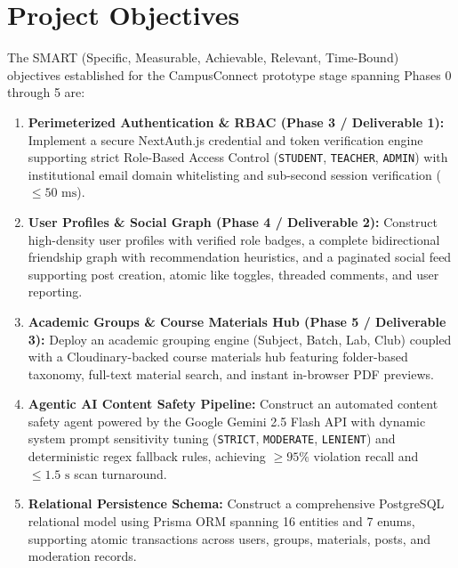 \documentclass[12pt, a4paper, oneside]{report}
\begin{document}
\section{Project Objectives}
The SMART (Specific, Measurable, Achievable, Relevant, Time-Bound) objectives established for the CampusConnect prototype stage spanning Phases 0 through 5 are:
\begin{enumerate}[leftmargin=0.7cm]
    \item \textbf{Perimeterized Authentication \& RBAC (Phase 3 / Deliverable 1):} Implement a secure NextAuth.js credential and token verification engine supporting strict Role-Based Access Control (\texttt{STUDENT}, \texttt{TEACHER}, \texttt{ADMIN}) with institutional email domain whitelisting and sub-second session verification ($\le 50\text{ ms}$).
    \item \textbf{User Profiles \& Social Graph (Phase 4 / Deliverable 2):} Construct high-density user profiles with verified role badges, a complete bidirectional friendship graph with recommendation heuristics, and a paginated social feed supporting post creation, atomic like toggles, threaded comments, and user reporting.
    \item \textbf{Academic Groups \& Course Materials Hub (Phase 5 / Deliverable 3):} Deploy an academic grouping engine (Subject, Batch, Lab, Club) coupled with a Cloudinary-backed course materials hub featuring folder-based taxonomy, full-text material search, and instant in-browser PDF previews.
    \item \textbf{Agentic AI Content Safety Pipeline:} Construct an automated content safety agent powered by the Google Gemini 2.5 Flash API with dynamic system prompt sensitivity tuning (\texttt{STRICT}, \texttt{MODERATE}, \texttt{LENIENT}) and deterministic regex fallback rules, achieving $\ge 95\%$ violation recall and $\le 1.5\text{ s}$ scan turnaround.
    \item \textbf{Relational Persistence Schema:} Construct a comprehensive PostgreSQL relational model using Prisma ORM spanning 16 entities and 7 enums, supporting atomic transactions across users, groups, materials, posts, and moderation records.
\end{enumerate}
\end{document}
